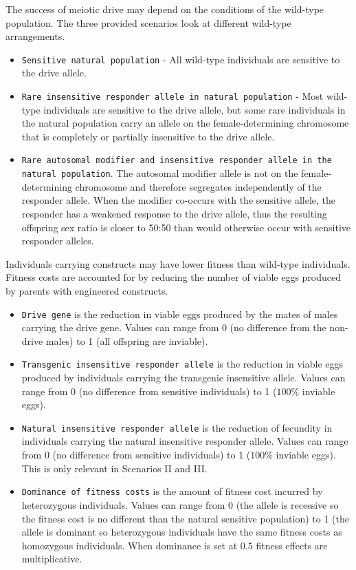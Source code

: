 \documentclass[11pt]{article}
\newcommand{\linecmd}[1]{\texttt{#1}}
\begin{document}
The success of meiotic drive may depend on the conditions of the wild-type population. The three provided scenarios look at different wild-type arrangements.
\begin{itemize}
	\item \linecmd{Sensitive natural population} - All wild-type individuals are sensitive to the drive allele.
	\item \linecmd{Rare insensitive responder allele in natural population} - Most wild-type individuals are sensitive to the drive allele, but some rare individuals in the natural population carry an allele on the female-determining chromosome that is completely or partially insensitive to the drive allele.
	\item \linecmd{Rare autosomal modifier and insensitive responder allele in the natural population}. The autosomal modifier allele is not on the female-determining chromosome and therefore segregates independently of the responder allele. When the modifier co-occurs with the sensitive allele, the responder has a weakened response to the drive allele, thus the resulting offspring sex ratio is closer to 50:50 than would otherwise occur with sensitive responder alleles.
\end{itemize}

Individuals carrying constructs may have lower fitness than wild-type individuals. Fitness costs are accounted for by reducing the number of viable eggs produced by parents with engineered constructs.
\begin{itemize}
	\item \linecmd{Drive gene} is the reduction in viable eggs produced by the mates of males carrying the drive gene. Values can range from 0 (no difference from the non-drive males) to 1 (all offspring are inviable).
	\item \linecmd{Transgenic insensitive responder allele} is the reduction in viable eggs produced by individuals carrying the transgenic insensitive allele. Values can range from 0 (no difference from sensitive individuals) to 1 ($100\%$ inviable eggs). 
	\item \linecmd{Natural insensitive responder allele} is the reduction of fecundity in individuals carrying the natural insensitive responder allele. Values can range from 0 (no difference from sensitive individuals) to 1 ($100\%$ inviable eggs). This is only relevant in Scenarios II and III.
	\item \linecmd{Dominance of fitness costs} is the amount of fitness cost incurred by heterozygous individuals. Values can range from 0 (the allele is recessive so the fitness cost is no different than the natural sensitive population) to 1 (the allele is dominant so heterozygous individuals have the same fitness costs as homozygous individuals. When dominance is set at $0.5$ fitness effects are multiplicative.
\end{itemize}
\end{document}
